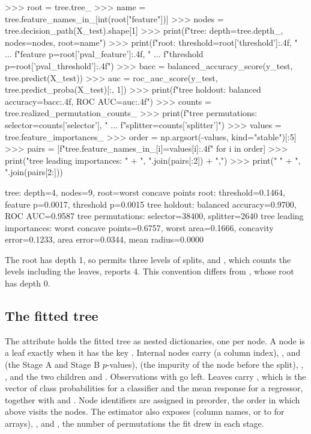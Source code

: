 \documentclass[article]{jss}
\newcommand{\sklearn}{\pkg{scikit-learn}\xspace}
\begin{document}
\begin{CodeChunk}
\begin{CodeInput}
>>> root = tree.tree_
>>> name = tree.feature_names_in_[int(root["feature"])]
>>> nodes = tree.decision_path(X_test).shape[1]
>>> print(f"tree: depth={tree.depth_}, nodes={nodes}, root={name}")
>>> print(f"root: threshold={root['threshold']:.4f}, "
...       f"feature p={root['pval_feature']:.4f}, "
...       f"threshold p={root['pval_threshold']:.4f}")
>>> bacc = balanced_accuracy_score(y_test, tree.predict(X_test))
>>> auc = roc_auc_score(y_test, tree.predict_proba(X_test)[:, 1])
>>> print(f"tree holdout: balanced accuracy={bacc:.4f}, ROC AUC={auc:.4f}")
>>> counts = tree.realized_permutation_counts_
>>> print(f"tree permutations: selector={counts['selector']}, "
...       f"splitter={counts['splitter']}")
>>> values = tree.feature_importances_
>>> order = np.argsort(-values, kind="stable")[:5]
>>> pairs = [f"{tree.feature_names_in_[i]}={values[i]:.4f}" for i in order]
>>> print("tree leading importances: " + ", ".join(pairs[:2]) + ",")
>>> print("  " + ", ".join(pairs[2:]))
\end{CodeInput}
\begin{CodeOutput}
tree: depth=4, nodes=9, root=worst concave points
root: threshold=0.1464, feature p=0.0017, threshold p=0.0015
tree holdout: balanced accuracy=0.9700, ROC AUC=0.9587
tree permutations: selector=38400, splitter=2640
tree leading importances: worst concave points=0.6757, worst area=0.1666,
  concavity error=0.1233, area error=0.0344, mean radius=0.0000
\end{CodeOutput}
\end{CodeChunk}
%
The root has depth 1, so  permits three levels of splits,
and , which counts the levels including the leaves, reports 4.
This convention differs from \sklearn, whose root has depth 0.

\subsection{The fitted tree} \label{sec:inspection}

The attribute  holds the fitted tree as nested 
dictionaries, one per node. A node is a leaf exactly when it has the key
. Internal nodes carry  (a column index),
,  and  (the Stage A
and Stage B $p$-values),  (the impurity of the node before the
split), , , and the two children
 and . Observations with
 go left. Leaves carry , which is
the vector of class probabilities for a classifier and the mean response for a
regressor, together with  and . Node identifiers
are assigned in preorder, the order in which  above visits the
nodes. The estimator also exposes  (column names, or
 to  for arrays), , and
, the number of permutations the fit drew in
each stage.
\end{document}
